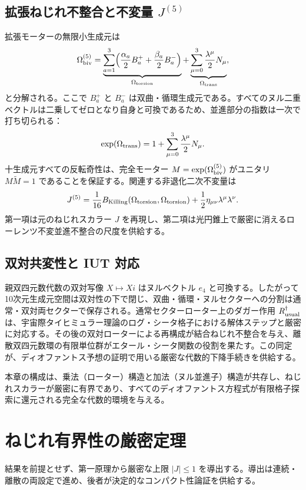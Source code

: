 \documentclass[a4paper]{article}
\theoremstyle{definition}
\begin{document}
\subsection{拡張ねじれ不整合と不変量 \texorpdfstring{$J^{(5)}$}{J5}}

拡張モーターの無限小生成元は
\[
\Omega_{\rm biv}^{(5)} = \underbrace{\sum_{a=1}^3 \Bigl( \frac{\alpha_a}{2} B_a^+ + \frac{\beta_a}{2} B_a^- \Bigr)}_{\Omega_{\rm torsion}} + \underbrace{\sum_{\mu=0}^3 \frac{\lambda^\mu}{2} N_\mu}_{\Omega_{\rm trans}},
\]
と分解される。ここで $B_a^+$ と $B_a^-$ は双曲・循環生成元である。すべてのヌル二重ベクトルは二乗してゼロとなり自身と可換であるため、並進部分の指数は一次で打ち切られる：
\[
\exp(\Omega_{\rm trans}) = 1 + \sum_{\mu=0}^3 \frac{\lambda^\mu}{2} N_\mu.
\]
十生成元すべての反転奇性は、完全モーター $M = \exp(\Omega_{\rm biv}^{(5)})$ がユニタリ $M \widetilde{M} = 1$ であることを保証する。関連する非退化二次不変量は
\[
J^{(5)} = \frac{1}{16} B_{\rm Killing}(\Omega_{\rm torsion}, \Omega_{\rm torsion}) + \frac{1}{2} \eta_{\mu\nu} \lambda^\mu \lambda^\nu.
\]
第一項は元のねじれスカラー $J$ を再現し、第二項は光円錐上で厳密に消えるローレンツ不変並進不整合の尺度を供給する。

\subsection{双対共変性と IUT 対応}

親双四元数代数の双対写像 $X \mapsto Xi$ はヌルベクトル $e_4$ と可換する。したがって10次元生成元空間は双対性の下で閉じ、双曲・循環・ヌルセクターへの分割は通常・双対両セクターで保存される。通常セクターローター上のダガー作用 $R_{\rm usual}^\dagger$ は、宇宙際タイヒミュラー理論のログ・シータ格子における解体ステップと厳密に対応する。その後の双対ローターによる再構成が結合ねじれ不整合を与え、離散双四元数環の有限単位群がエタール・シータ関数の役割を果たす。この同定が、ディオファントス予想の証明で用いる厳密な代数的下降手続きを供給する。

本章の構成は、乗法（ローター）構造と加法（ヌル並進子）構造が共存し、ねじれスカラーが厳密に有界であり、すべてのディオファントス方程式が有限格子探索に還元される完全な代数的環境を与える。

\section{ねじれ有界性の厳密定理}

結果を前提とせず、第一原理から厳密な上限 $|J| \leq 1$ を導出する。導出は連続・離散の両設定で進め、後者が決定的なコンパクト性論証を供給する。
\end{document}
